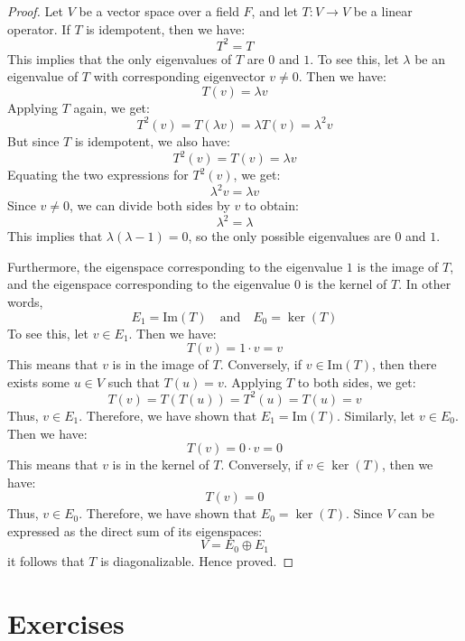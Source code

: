 \documentclass[openany]{book}
\begin{document}
\begin{proof}
    Let $V$ be a vector space over a field $F$, and let $T: V \to V$ be a linear operator. If $T$ is idempotent, then we have:
    $$T^2 = T$$
    This implies that the only eigenvalues of $T$ are $0$ and $1$. To see this, let $\lambda$ be an eigenvalue of $T$ with corresponding eigenvector $v \neq 0$. Then we have:
    $$T(v) = \lambda v$$
    Applying $T$ again, we get:
    $$T^2(v) = T(\lambda v) = \lambda T(v) = \lambda^2 v$$
    But since $T$ is idempotent, we also have:
    $$T^2(v) = T(v) = \lambda v$$
    Equating the two expressions for $T^2(v)$, we get:
    $$\lambda^2 v = \lambda v$$
    Since $v \neq 0$, we can divide both sides by $v$ to obtain:
    $$\lambda^2 = \lambda$$
    This implies that $\lambda(\lambda - 1) = 0$, so the only possible eigenvalues are $0$ and $1$.

    Furthermore, the eigenspace corresponding to the eigenvalue $1$ is the image of $T$, and the eigenspace corresponding to the eigenvalue $0$ is the kernel of $T$. In other words,
    $$E_1 = \text{Im}(T) \quad \text{and} \quad E_0 = \ker(T)$$
    To see this, let $v \in E_1$. Then we have:
    $$T(v) = 1 \cdot v = v$$
    This means that $v$ is in the image of $T$. Conversely, if $v \in \text{Im}(T)$, then there exists some $u \in V$ such that $T(u) = v$. Applying $T$ to both sides, we get:
    $$T(v) = T(T(u)) = T^2(u) = T(u) = v$$
    Thus, $v \in E_1$. Therefore, we have shown that $E_1 = \text{Im}(T)$.
    Similarly, let $v \in E_0$. Then we have:
    $$T(v) = 0 \cdot v = 0$$
    This means that $v$ is in the kernel of $T$. Conversely, if $v \in \ker(T)$, then we have:
    $$T(v) = 0$$
    Thus, $v \in E_0$. Therefore, we have shown that $E_0 = \ker(T)$.
    Since $V$ can be expressed as the direct sum of its eigenspaces:
    $$V = E_0 \oplus E_1$$
    it follows that $T$ is diagonalizable. Hence proved.
\end{proof}
\section{Exercises}
\end{document}
